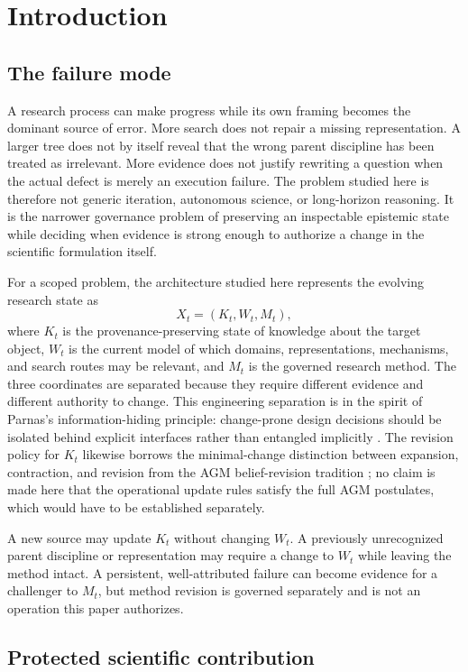 \section{Introduction}

\subsection{The failure mode}

A research process can make progress while its own framing becomes the dominant source of error. More search does not repair a missing representation. A larger tree does not by itself reveal that the wrong parent discipline has been treated as irrelevant. More evidence does not justify rewriting a question when the actual defect is merely an execution failure. The problem studied here is therefore not generic iteration, autonomous science, or long-horizon reasoning. It is the narrower governance problem of preserving an inspectable epistemic state while deciding when evidence is strong enough to authorize a change in the scientific formulation itself.

For a scoped problem, the architecture studied here represents the evolving research state as
\[
X_t=(K_t,W_t,M_t),
\]
where $K_t$ is the provenance-preserving state of knowledge about the target object, $W_t$ is the current model of which domains, representations, mechanisms, and search routes may be relevant, and $M_t$ is the governed research method. The three coordinates are separated because they require different evidence and different authority to change. This engineering separation is in the spirit of Parnas's information-hiding principle: change-prone design decisions should be isolated behind explicit interfaces rather than entangled implicitly \cite{parnas1972}. The revision policy for $K_t$ likewise borrows the minimal-change distinction between expansion, contraction, and revision from the AGM belief-revision tradition \cite{agm1985}; no claim is made here that the operational update rules satisfy the full AGM postulates, which would have to be established separately.

A new source may update $K_t$ without changing $W_t$. A previously unrecognized parent discipline or representation may require a change to $W_t$ while leaving the method intact. A persistent, well-attributed failure can become evidence for a challenger to $M_t$, but method revision is governed separately and is not an operation this paper authorizes.

\subsection{Protected scientific contribution}

